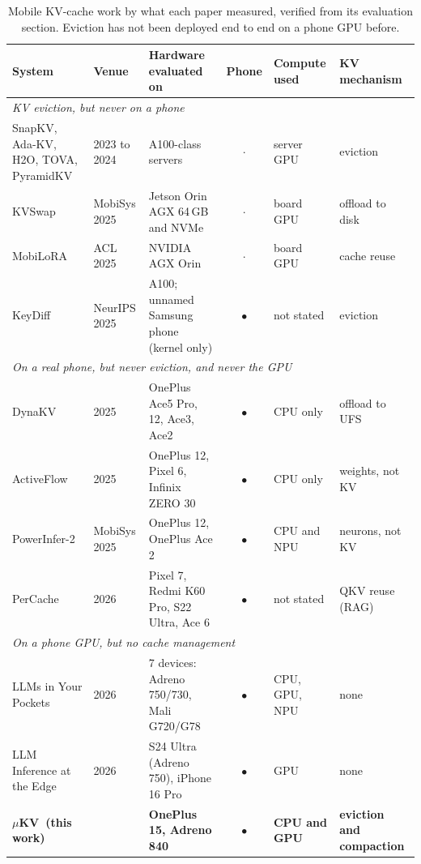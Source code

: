 \documentclass[sigconf, anonymous=false, screen=true]{acmart}
\newcommand{\yes}{$\bullet$}
\newcommand{\no}{$\cdot$}
\newcommand{\muKV}{$\mu$KV}
\begin{document}
\begin{table}[tb]
\caption{Mobile KV-cache work by what each paper measured, verified from its evaluation section. Eviction has not been deployed end to end on a phone GPU before.}
\label{tab:related-mobile}
\centering\footnotesize
\setlength{\tabcolsep}{4pt}
\begin{tabular}{l l l c l l}
\toprule
\textbf{System} & \textbf{Venue} & \textbf{Hardware evaluated on} & \textbf{Phone} & \textbf{Compute used} & \textbf{KV mechanism} \\
\midrule
\multicolumn{6}{l}{\emph{KV eviction, but never on a phone}} \\
SnapKV, Ada-KV, H2O, TOVA, PyramidKV & 2023 to 2024 & A100-class servers & \no & server GPU & eviction \\
KVSwap & MobiSys 2025 & Jetson Orin AGX 64\,GB and NVMe & \no & board GPU & offload to disk \\
MobiLoRA & ACL 2025 & NVIDIA AGX Orin & \no & board GPU & cache reuse \\
KeyDiff & NeurIPS 2025 & A100; unnamed Samsung phone (kernel only) & \yes & not stated & eviction \\
\midrule
\multicolumn{6}{l}{\emph{On a real phone, but never eviction, and never the GPU}} \\
DynaKV & 2025 & OnePlus Ace5 Pro, 12, Ace3, Ace2 & \yes & CPU only & offload to UFS \\
ActiveFlow & 2025 & OnePlus 12, Pixel 6, Infinix ZERO 30 & \yes & CPU only & weights, not KV \\
PowerInfer-2 & MobiSys 2025 & OnePlus 12, OnePlus Ace 2 & \yes & CPU and NPU & neurons, not KV \\
PerCache & 2026 & Pixel 7, Redmi K60 Pro, S22 Ultra, Ace 6 & \yes & not stated & QKV reuse (RAG) \\
\midrule
\multicolumn{6}{l}{\emph{On a phone GPU, but no cache management}} \\
LLMs in Your Pockets & 2026 & 7 devices: Adreno 750/730, Mali G720/G78 & \yes & CPU, GPU, NPU & none \\
LLM Inference at the Edge & 2026 & S24 Ultra (Adreno 750), iPhone 16 Pro & \yes & GPU & none \\
\midrule
\textbf{\muKV\ (this work)} & & \textbf{OnePlus 15, Adreno 840} & \yes & \textbf{CPU and GPU} & \textbf{eviction and compaction} \\
\bottomrule
\end{tabular}
\end{table}
\end{document}
